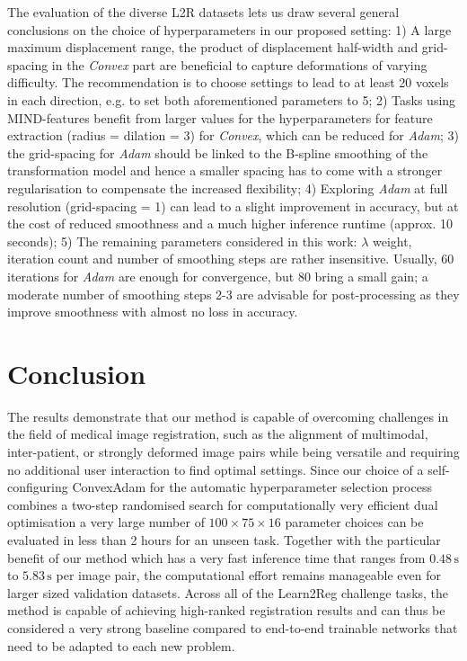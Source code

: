 The evaluation of the diverse L2R datasets lets us draw several general conclusions on the choice of hyperparameters in our proposed setting: 1) A large maximum displacement range, the product of displacement half-width and grid-spacing in the \emph{Convex} part are beneficial to capture deformations of varying difficulty. The recommendation is to choose settings to lead to at least 20 voxels in each direction, e.g. to set both aforementioned parameters to 5; 2) Tasks using MIND-features benefit from larger values for the hyperparameters for feature extraction (radius = dilation = 3) for \emph{Convex}, which can be reduced for \emph{Adam}; 3) the grid-spacing for \emph{Adam} should be linked to the B-spline smoothing of the transformation model and hence a smaller spacing has to come with a stronger regularisation to compensate the increased flexibility; 4) Exploring \emph{Adam} at full resolution (grid-spacing = 1) can lead to a slight improvement in accuracy, but at the cost of reduced smoothness and a much higher inference runtime (approx. 10 seconds); 5) The remaining parameters considered in this work: $\lambda$ weight, iteration count and number of smoothing steps are rather insensitive. Usually, 60 iterations for \emph{Adam} are enough for convergence, but 80 bring a small gain; a moderate number of smoothing steps 2-3 are advisable for post-processing as they improve smoothness with almost no loss in accuracy.

\section{Conclusion}


The results demonstrate that our method is capable of overcoming challenges in the field of medical image registration, such as the alignment of multimodal, inter-patient, or strongly deformed image pairs while being versatile and requiring no additional user interaction to find optimal settings. Since our choice of a self-configuring ConvexAdam for the automatic hyperparameter selection process combines a two-step randomised search for computationally very efficient dual optimisation a very large number of $100\times75\times16$ parameter choices can be evaluated in less than 2 hours for an unseen task. Together with the particular benefit of our method which has a very fast inference time that ranges from $0.48\,\text{s}$ to $5.83\,\text{s}$ per image pair, the computational effort remains manageable even for larger sized validation datasets. Across all of the Learn2Reg challenge tasks, the method is capable of achieving high-ranked registration results and can thus be considered a very strong baseline compared to end-to-end trainable networks that need to be adapted to each new problem.